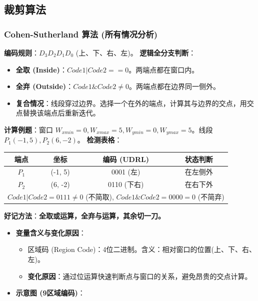 \documentclass[UTF8]{ctexart}
\begin{document}
\subsection{裁剪算法}

\subsubsection{Cohen-Sutherland 算法 (所有情况分析)}
\textbf{编码规则}：$D_3 D_2 D_1 D_0$ (上、下、右、左)。
\textbf{逻辑全分支判断}：
\begin{itemize}
    \item \textbf{全取 (Inside)}：$Code1 | Code2 == 0$。两端点都在窗口内。
    \item \textbf{全弃 (Outside)}：$Code1 \& Code2 \ne 0$。两端点都在边界同一侧外。
    \item \textbf{复合情况}：线段穿过边界。选择一个在外的端点，计算其与边界的交点，用交点替换该端点后重新迭代。
\end{itemize}
\textbf{计算例题}：窗口 $W_{xmin}=0, W_{xmax}=5, W_{ymin}=0, W_{ymax}=5$。线段 $P_1(-1, 5), P_2(6, -2)$。
    \textbf{检测表格}：
    \begin{center}
    \begin{tabular}{|c|c|c|c|}
        \hline
        端点 & 坐标 & 编码 (UDRL) & 状态判断 \\
        \hline
        $P_1$ & (-1, 5) & 0001 (左) & 在左侧外 \\
        $P_2$ & (6, -2) & 0110 (下右) & 在右下外 \\
        \hline
        \multicolumn{4}{|c|}{$Code1 | Code2 = 0111 \ne 0$ (不简取), $Code1 \& Code2 = 0000 = 0$ (不简弃)} \\
        \hline
    \end{tabular}
    \end{center}
\textbf{好记方法}：\textbf{全取或运算，全弃与运算，其余切一刀。}
    \begin{itemize}
    \item \textbf{变量含义与变化原因}：
    \begin{itemize}
        \item 区域码 (Region Code)：4位二进制。含义：相对窗口的位置(上、下、右、左)。
        \item \textbf{变化原因}：通过位运算快速判断点与窗口的关系，避免昂贵的交点计算。
    \end{itemize}
    \item \textbf{示意图 (9区域编码)}：
    \begin{center}
    \end{center}
    \end{itemize}
\end{document}
